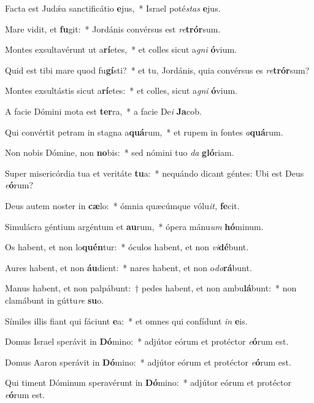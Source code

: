 \item Facta est Judǽa sanctificátio \textbf{e}jus,~* Israel poté\tinyhspace\textit{stas} \textbf{e}jus.
\item Mare vidit, et \textbf{fu}git:~* Jordánis convérsus est \textit{re}\textbf{trór}sum.
\item Montes exsultavérunt ut a\textbf{rí}etes,~* et colles sicut a\textit{gni} \textbf{ó}vium.
\item Quid est tibi mare quod fu\textbf{gí}sti?~* et tu, Jordánis, quia convérsus es \textit{re}\textbf{trór}sum?
\item Montes exsultástis sicut a\textbf{rí}etes:~* et colles, sicut a\textit{gni} \textbf{ó}vium.
\item A facie Dómini mota est \textbf{ter}ra,~* a facie De\tinyhspace\textit{i} \textbf{Ja}cob.
\item Qui convértit petram in stagna a\textbf{quá}rum,~* et rupem in fontes \textit{a}\textbf{quá}rum.
\item Non nobis Dómine, non \textbf{no}bis:~* sed nómini tuo \textit{da} \textbf{gló}riam.
\item Super misericórdia tua et veritáte \textbf{tu}a:~* nequándo dicant géntes: Ubi est Deus \textit{e}\textbf{ó}rum?
\item Deus autem noster in \textbf{cæ}lo:~* ómnia quæcúmque vólu\textit{it,} \textbf{fe}cit.
\item Simulácra géntium argéntum et \textbf{au}rum,~* ópera mánu\hspace*{0.01em}\textit{um} \textbf{hó}minum.
\item Os habent, et non lo\textbf{quén}tur:~* óculos habent, et non \textit{vi}\hspace*{-0.01em}\textbf{dé}bunt.
\item Aures habent, et non \textbf{áu}dient:~* nares habent, et non o\textit{do}\textbf{rá}bunt.
\item Manus habent, et non palpábunt:~† pedes habent, et non ambu\textbf{lá}bunt:~* non clamábunt in gúttu\textit{re} \textbf{su}o.
\item Símiles illis fiant qui fáciunt \textbf{e}a:~* et omnes qui confídunt \textit{in} \textbf{e}is.
\item Domus Israel sperávit in \textbf{Dó}mino:~* adjútor eórum et protéctor \textit{e}\textbf{ó}rum est.
\item Domus Aaron sperávit in \textbf{Dó}mino:~* adjútor eórum et protéctor \textit{e}\textbf{ó}rum est.
\item Qui timent Dóminum speravérunt in \textbf{Dó}mino:~* adjútor eórum et protéctor \textit{e}\textbf{ó}rum est.
